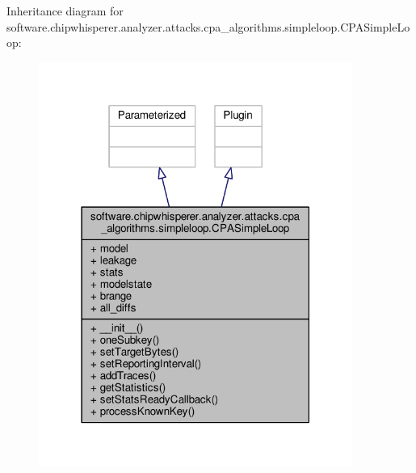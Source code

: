 Inheritance diagram for software.\+chipwhisperer.\+analyzer.\+attacks.\+cpa\+\_\+algorithms.\+simpleloop.\+C\+P\+A\+Simple\+Loop\+:\nopagebreak
\begin{figure}[H]
\begin{center}
\leavevmode
\includegraphics[width=291pt]{d5/dee/classsoftware_1_1chipwhisperer_1_1analyzer_1_1attacks_1_1cpa__algorithms_1_1simpleloop_1_1CPASimpleLoop__inherit__graph}
\end{center}
\end{figure}


